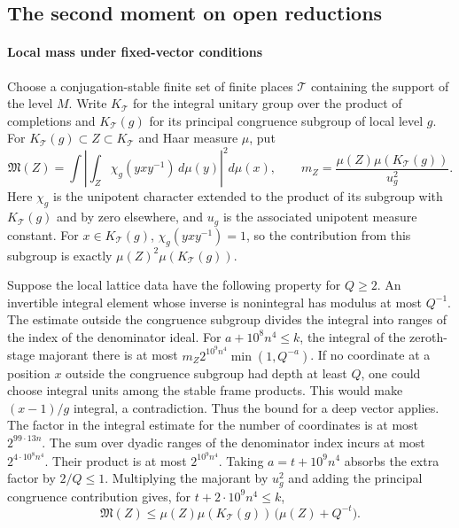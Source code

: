 \subsection{The second moment on open reductions}\label{sec:span-open-proof}

\paragraph{Local mass under fixed-vector conditions}
Choose a conjugation-stable finite set of finite places \(\mathcal T\)
containing the support of the level \(M\). Write \(K_{\mathcal T}\) for the
integral unitary group over the product of completions and
\(K_{\mathcal T}(g)\) for its principal congruence subgroup of local level
\(g\). For \(K_{\mathcal T}(g)\subset Z\subset K_{\mathcal T}\) and Haar
measure \(\mu\), put
\[
 \mathfrak M(Z)=\int
    \left|\int_Z \chi_g(yxy^{-1})\,d\mu(y)\right|^2d\mu(x),
 \qquad
 m_Z=\frac{\mu(Z)\mu(K_{\mathcal T}(g))}{u_g^2}.
\]
Here \(\chi_g\) is the unipotent character extended to the product of its
subgroup with \(K_{\mathcal T}(g)\) and by zero elsewhere, and \(u_g\) is
the associated unipotent measure constant. For \(x\in K_{\mathcal T}(g)\),
\(\chi_g(yxy^{-1})=1\), so the contribution from this subgroup is exactly
\(\mu(Z)^2\mu(K_{\mathcal T}(g))\).

Suppose the local lattice data have the following property for \(Q\ge2\).
An invertible integral element whose inverse is nonintegral has modulus
at most \(Q^{-1}\). The estimate outside the congruence subgroup divides
the integral into ranges of the index of the denominator ideal. For
\(a+10^8n^4\le k\), the integral of the zeroth-stage majorant there is at most
\(m_Z2^{10^9n^4}\min(1,Q^{-a})\). If no coordinate at a position \(x\) outside the congruence subgroup
had depth at least \(Q\), one could choose integral units among the
stable frame products. This would make \((x-1)/g\) integral, a contradiction.
Thus the bound for a deep vector applies. The factor in the integral
estimate for the number of coordinates is at most \(2^{99\cdot13n}\).
The sum over dyadic ranges of the denominator index incurs at most
\(2^{4\cdot10^8n^4}\). Their product is at most \(2^{10^9n^4}\).
Taking \(a=t+10^9n^4\) absorbs the extra factor by
\(2/Q\le1\). Multiplying the majorant by \(u_g^2\) and adding the principal
congruence contribution gives, for \(t+2\cdot10^9n^4\le k\),
\begin{equation}\label{eq:span-local-mass}
 \mathfrak M(Z)
 \le\mu(Z)\mu(K_{\mathcal T}(g))\,\bigl(\mu(Z)+Q^{-t}\bigr).
\end{equation}

